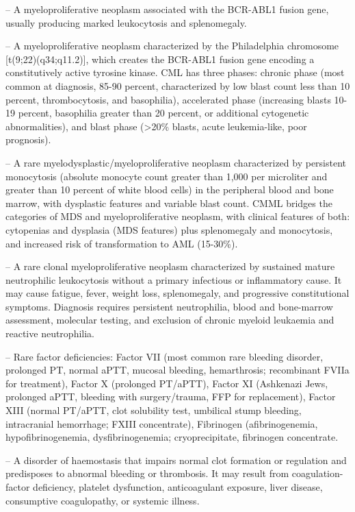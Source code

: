 -- A myeloproliferative neoplasm associated with the BCR-ABL1 fusion gene, usually producing marked leukocytosis and splenomegaly.

-- A myeloproliferative neoplasm characterized by the Philadelphia chromosome [t(9;22)(q34;q11.2)], which creates the BCR-ABL1 fusion gene encoding a constitutively active tyrosine kinase. CML has three phases: chronic phase (most common at diagnosis, 85-90 percent, characterized by low blast count less than 10 percent, thrombocytosis, and basophilia), accelerated phase (increasing blasts 10-19 percent, basophilia greater than 20 percent, or additional cytogenetic abnormalities), and blast phase (>20\% blasts, acute leukemia-like, poor prognosis).

-- A rare myelodysplastic/myeloproliferative neoplasm characterized by persistent monocytosis (absolute monocyte count greater than 1,000 per microliter and greater than 10 percent of white blood cells) in the peripheral blood and bone marrow, with dysplastic features and variable blast count. CMML bridges the categories of MDS and myeloproliferative neoplasm, with clinical features of both: cytopenias and dysplasia (MDS features) plus splenomegaly and monocytosis, and increased risk of transformation to AML (15-30\%).

-- A rare clonal myeloproliferative neoplasm characterized by sustained mature neutrophilic leukocytosis without a primary infectious or inflammatory cause. It may cause fatigue, fever, weight loss, splenomegaly, and progressive constitutional symptoms. Diagnosis requires persistent neutrophilia, blood and bone-marrow assessment, molecular testing, and exclusion of chronic myeloid leukaemia and reactive neutrophilia.

-- Rare factor deficiencies: Factor VII (most common rare bleeding disorder, prolonged PT, normal aPTT, mucosal bleeding, hemarthrosis; recombinant FVIIa for treatment), Factor X (prolonged PT/aPTT), Factor XI (Ashkenazi Jews, prolonged aPTT, bleeding with surgery/trauma, FFP for replacement), Factor XIII (normal PT/aPTT, clot solubility test, umbilical stump bleeding, intracranial hemorrhage; FXIII concentrate), Fibrinogen (afibrinogenemia, hypofibrinogenemia, dysfibrinogenemia; cryoprecipitate, fibrinogen concentrate.

-- A disorder of haemostasis that impairs normal clot formation or regulation and predisposes to abnormal bleeding or thrombosis. It may result from coagulation-factor deficiency, platelet dysfunction, anticoagulant exposure, liver disease, consumptive coagulopathy, or systemic illness.

